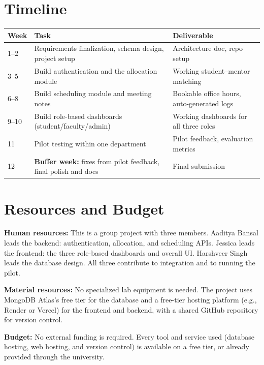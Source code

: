 \documentclass[11pt]{article}
\begin{document}
\section{Timeline}
\begin{center}
\begin{tabular}{@{}p{1.6cm}p{6.2cm}p{6.2cm}@{}}
\toprule
\textbf{Week} & \textbf{Task} & \textbf{Deliverable} \\
\midrule
1--2 & Requirements finalization, schema design, project setup & Architecture doc, repo setup \\
3--5 & Build authentication and the allocation module & Working student--mentor matching \\
6--8 & Build scheduling module and meeting notes & Bookable office hours, auto-generated logs \\
9--10 & Build role-based dashboards (student/faculty/admin) & Working dashboards for all three roles \\
11 & Pilot testing within one department & Pilot feedback, evaluation metrics \\
12 & \textbf{Buffer week:} fixes from pilot feedback, final polish and docs & Final submission \\
\bottomrule
\end{tabular}
\end{center}

\section{Resources and Budget}
\textbf{Human resources:} This is a group project with three members. Aaditya Bansal leads the backend: authentication, allocation, and scheduling APIs. Jessica leads the frontend: the three role-based dashboards and overall UI. Harshveer Singh leads the database design. All three contribute to integration and to running the pilot.

\textbf{Material resources:} No specialized lab equipment is needed. The project uses MongoDB Atlas's free tier for the database and a free-tier hosting platform (e.g., Render or Vercel) for the frontend and backend, with a shared GitHub repository for version control.

\textbf{Budget:} No external funding is required. Every tool and service used (database hosting, web hosting, and version control) is available on a free tier, or already provided through the university.
\end{document}
